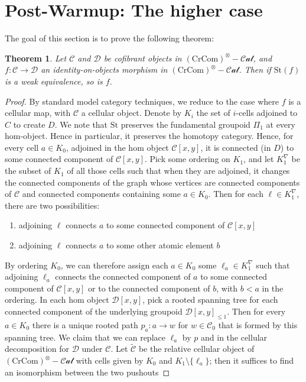 \documentclass[12pt]{article}
\newtheorem{theorem}{Theorem}[section]
\theoremstyle{definition}
\newcommand{\C}{\mathcal{C}}
\newcommand{\D}{\mathcal{D}}
\newcommand{\crcom}{\text{CrCom}}
\newcommand{\tensorcrossedcat}{(\crcom)^\otimes-\mathcal{Cat}}
\newcommand{\st}{\text{St}}
\begin{document}
\section{Post-Warmup: The higher case}
	The goal of this section is to prove the following theorem:
	\begin{theorem}
		Let $\C$ and $\D$ be cofibrant objects in $\tensorcrossedcat$, and $f: \C \to \D$ an identity-on-objects morphism in $\tensorcrossedcat$. 
		Then if $\st(f)$ is a weak equivalence, so is $f$.
	\end{theorem}
	\begin{proof}
		By standard model category techniques, we reduce to the case where $f$ is a cellular map, with $\C$ a cellular object. 
		Denote by $K_i$ the set of $i$-cells adjoined to $C$ to create $D$.
		We note that $\st$ preserves the fundamental groupoid $\Pi_1$ at every hom-object. 
		Hence in particular, it preserves the homotopy category. 
		Hence, for every cell $a \in K_0$, adjoined in the hom object $\C[x,y]$, it is connected (in $D$) to some connected component of $\C[x,y]$. 
		Pick some ordering on $K_1$, and let $K_1^\nabla$ be the subset of $K_1$ of all those cells such that when they are adjoined, it changes the connected components of the graph whose vertices are connected components of $\C$ and connected components containing some $a \in K_0$.
		Then for each $\ell \in K_1^\nabla$, there are two possibilities:
		\begin{enumerate}
			\item adjoining $\ell$ connects $a$ to some connected component of $\C[x,y]$
			\item adjoining $\ell$ connects $a$ to some other atomic element $b$ 
		\end{enumerate}
		By ordering $K_0$, we can therefore assign each $a \in K_0$ some $\ell_a \in K_1^\nabla$ such that adjoining $\ell_a$ connects the connected component of $a$ to some connected component of $\C[x,y]$ or to the connected component of $b$, with $b < a$ in the ordering.
		In each hom object $\D[x,y]$, pick a rooted spanning tree for each connected component of the underlying groupoid $\D[x,y]_{\le 1}$. 
		Then for every $a \in K_0$ there is a unique rooted path $p_a: a \to w$ for $w \in \C_0$ that is formed by this spanning tree. 
		We claim that we can replace $\ell_a$ by $p$ and in the cellular decomposition for $\D$ under $\C$. 
		Let $\tilde{\C}$ be the relative cellular object of $\tensorcrossedcat$ with cells given by $K_0$ and $K_1 \setminus \{\ell_a\}$; then it suffices to find an isomorphism between the two pushouts

\end{proof}
\end{document}
